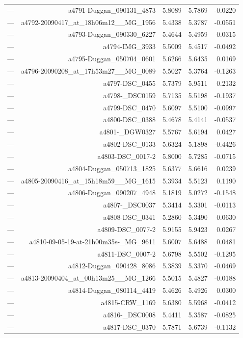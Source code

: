 \begin{table}[htbp]
\begin{tabular}{lrrrr}
— & a4791-Duggan_090131_4873 & 5.8089 & 5.7869 & -0.0220 \\
— & a4792-20090417_at_18h06m12__MG_1956 & 5.4338 & 5.3787 & -0.0551 \\
— & a4793-Duggan_090330_6227 & 5.4644 & 5.4959 & 0.0315 \\
— & a4794-IMG_3933 & 5.5009 & 5.4517 & -0.0492 \\
— & a4795-Duggan_050704_0601 & 5.6266 & 5.6435 & 0.0169 \\
— & a4796-20090208_at_17h53m27__MG_0089 & 5.5027 & 5.3764 & -0.1263 \\
— & a4797-DSC_0455 & 5.7379 & 5.9511 & 0.2132 \\
— & a4798-_DSC0159 & 5.7135 & 5.5198 & -0.1937 \\
— & a4799-DSC_0470 & 5.6097 & 5.5100 & -0.0997 \\
— & a4800-DSC_0388 & 5.4678 & 5.4141 & -0.0537 \\
— & a4801-_DGW0327 & 5.5767 & 5.6194 & 0.0427 \\
— & a4802-DSC_0133 & 5.6324 & 5.1898 & -0.4426 \\
— & a4803-DSC_0017-2 & 5.8000 & 5.7285 & -0.0715 \\
— & a4804-Duggan_050713_1825 & 5.6377 & 5.6616 & 0.0239 \\
— & a4805-20090416_at_15h18m59__MG_1615 & 5.3934 & 5.5123 & 0.1190 \\
— & a4806-Duggan_090207_4948 & 5.1819 & 5.0272 & -0.1548 \\
— & a4807-_DSC0037 & 5.3414 & 5.3301 & -0.0113 \\
— & a4808-DSC_0341 & 5.2860 & 5.3490 & 0.0630 \\
— & a4809-DSC_0077-2 & 5.9155 & 5.9423 & 0.0267 \\
— & a4810-09-05-19-at-21h00m35s-_MG_9611 & 5.6007 & 5.6488 & 0.0481 \\
— & a4811-DSC_0007-2 & 5.6798 & 5.5502 & -0.1295 \\
— & a4812-Duggan_090428_8086 & 5.3839 & 5.3370 & -0.0469 \\
— & a4813-20090404_at_00h13m25__MG_1266 & 5.5015 & 5.4827 & -0.0188 \\
— & a4814-Duggan_080114_4419 & 5.4626 & 5.4926 & 0.0300 \\
— & a4815-CRW_1169 & 5.6380 & 5.5968 & -0.0412 \\
— & a4816-_DSC0008 & 5.4411 & 5.3587 & -0.0825 \\
— & a4817-DSC_0370 & 5.7871 & 5.6739 & -0.1132 \\

\end{tabular}
\end{table}
